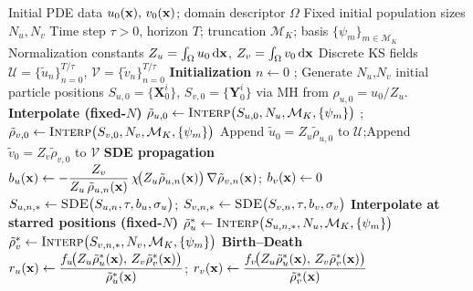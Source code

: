 \documentclass[a4paper,fleqn]{cas-sc}
\theoremstyle{definition}
\theoremstyle{remark}
\begin{document}
\begin{algorithm}
\caption{Stochastic Branching for keller--Segel equation}\label{alg:ks}
\begin{algorithmic}
\Require Initial PDE data $u_0(\mathbf{x}),\,v_0(\mathbf{x})$; domain descriptor $\Omega$
\Require Fixed initial population sizes $N_u, N_v$
\Require Time step $\tau>0$, horizon $T$; truncation $\mathcal M_K$; basis $\{\psi_m\}_{m\in\mathcal M_K}$
\Require Normalization constants $Z_u=\int_\Omega u_0\,\mathrm d\mathbf{x}$, $Z_v=\int_\Omega v_0\,\mathrm d\mathbf{x}$
\Ensure Discrete KS fields $\mathcal U=\{\tilde u_n\}_{n=0}^{T/\tau}$, $\mathcal V=\{\tilde v_n\}_{n=0}^{T/\tau}$
  \State \textbf{Initialization}
  \State $n\gets 0$
  ; Generate $N_u$,$N_v$ initial particle positions $S_{u,0}=\{\mathbf X^i_0\}$, $S_{v,0}=\{\mathbf Y^i_0\}$ via MH from $\rho_{u,0}=u_0/Z_u$.
  \State \textbf{Interpolate (fixed-$N$)}
  \State $\tilde\rho_{u,0} \gets \textsc{Interp}\big(S_{u,0},N_u,\mathcal M_K,\{\psi_m\}\big)$
  ; $\tilde\rho_{v,0} \gets \textsc{Interp}\big(S_{v,0},N_v,\mathcal M_K,\{\psi_m\}\big)$
  \State Append $\tilde u_0 = Z_u \tilde\rho_{u,0}$ to $\mathcal U$;\quad Append $\tilde v_0 = Z_v \tilde\rho_{v,0}$ to $\mathcal V$
    \State \textbf{SDE propagation}
    \State $b_u(\mathbf{x}) \gets -\dfrac{Z_v}{Z_u\,\tilde\rho_{u,n}(\mathbf{x})}\,\chi\!\big(Z_u\tilde\rho_{u,n}(\mathbf{x})\big)\,\nabla\tilde\rho_{v,n}(\mathbf{x})$; $b_v(\mathbf{x}) \gets 0$
    \State $S_{u,n,*} \gets \textsc{SDE}\big(S_{u,n},\tau,b_u,\sigma_u\big)$; $S_{v,n,*} \gets \textsc{SDE}\big(S_{v,n},\tau,b_v,\sigma_v\big)$
    \State \textbf{Interpolate at starred positions (fixed-$N$)}
    \State $\tilde\rho_u^* \gets \textsc{Interp}\big(S_{u,n,*},N_u,\mathcal M_K,\{\psi_m\}\big)$
    \State $\tilde\rho_v^* \gets \textsc{Interp}\big(S_{v,n,*},N_v,\mathcal M_K,\{\psi_m\}\big)$
    \State \textbf{Birth--Death}
    \State $r_u(\mathbf{x}) \gets \dfrac{f_u\!\big(Z_u\tilde\rho_u^*(\mathbf{x}),\,Z_v\tilde\rho_v^*(\mathbf{x})\big)}{\tilde\rho_u^*(\mathbf{x})}$; $r_v(\mathbf{x}) \gets \dfrac{f_v\!\big(Z_u\tilde\rho_u^*(\mathbf{x}),\,Z_v\tilde\rho_v^*(\mathbf{x})\big)}{\tilde\rho_v^*(\mathbf{x})}$

\end{algorithmic}
\end{algorithm}
\end{document}
